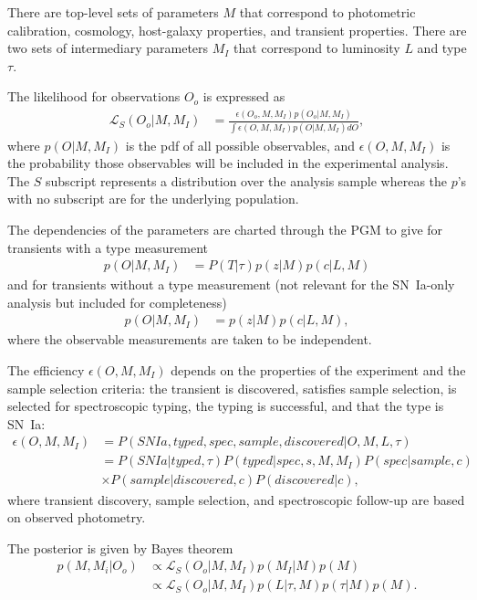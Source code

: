 \documentclass[preprint,3p]{elsarticle}
\begin{document}
There are top-level  sets of parameters $M$ that correspond to photometric calibration, cosmology,
host-galaxy properties, and transient properties.
There are two sets of intermediary parameters $M_I$ that correspond to luminosity $L$ and type $\tau$.

The likelihood for observations $O_o$ is expressed as
\begin{align*}
\mathcal{L}_S(O_o | M, M_I) & = \frac{\epsilon(O_o, M, M_I) p(O_o|M, M_I)}{\int  \epsilon(O, M, M_I) p(O|M, M_I)dO},
\end{align*}
where $p(O|M, M_I)$ is the pdf of all possible observables, and $\epsilon(O, M, M_I) $
is the probability those observables will be included in the experimental analysis.  The $S$ subscript represents a
distribution over the analysis sample whereas the $p$'s with no subscript are for the underlying population.


The dependencies of the parameters are charted through the PGM to give for transients with a type measurement
\begin{align*}
p(O| M, M_I) & = P(T | \tau) p(z | M) p(c | L, M)
\end{align*}
and for transients without a type measurement (not relevant for the SN~Ia-only analysis but included for completeness)
\begin{align*}
p(O| M, M_I) & = p(z | M) p(c | L, M),
\end{align*}
where the observable measurements are taken to be independent.

The efficiency $\epsilon(O, M, M_I) $ depends on the properties of the experiment and the sample selection criteria:
the transient is discovered, satisfies sample selection, is selected for spectroscopic typing, the typing
is successful, and that the type is SN~Ia:
\begin{align*}
\epsilon(O, M, M_I)  & = P(SNIa, typed, spec, sample, discovered |O, M, L, \tau)\\
& = P(SNIa|  typed, \tau)P(typed | spec, s, M, M_I)P(spec | sample, c) \\
& \times P(sample| discovered, c)P(discovered |c),
\end{align*}
where transient discovery, sample selection, and spectroscopic follow-up are based on observed photometry.

The posterior is given by Bayes theorem
\begin{align*}
p(M, M_i | O_o) & \propto \mathcal{L}_S(O_o| M, M_I) p(M_I|M) p(M)\\
 & \propto \mathcal{L}_S(O_o| M, M_I) p(L| \tau, M) p(\tau|M) p(M).
\end{align*}
\end{document}
